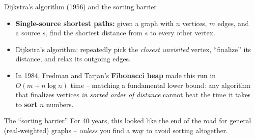 \documentclass[11pt,aspectratio=169]{beamer}
\begin{document}
\begin{frame}{Dijkstra's algorithm (1956) and the sorting barrier}
  \begin{itemize}
    \item \textbf{Single-source shortest paths:} given a graph with $n$ vertices, $m$
    edges, and a source $s$, find the shortest distance from $s$ to every other vertex.
    \item Dijkstra's algorithm: repeatedly pick the \emph{closest unvisited} vertex,
    ``finalize'' its distance, and relax its outgoing edges.
    \item In 1984, Fredman and Tarjan's \textbf{Fibonacci heap} made this run in
    $O(m + n\log n)$ time -- matching a fundamental lower bound: any algorithm that
    finalizes vertices \emph{in sorted order of distance} cannot beat the time it takes
    to \textbf{sort} $n$ numbers.
  \end{itemize}
  \begin{exampleblock}{The ``sorting barrier''}
    For 40 years, this looked like the end of the road for general (real-weighted)
    graphs -- \emph{unless} you find a way to avoid sorting altogether.
  \end{exampleblock}
\end{frame}
\end{document}
